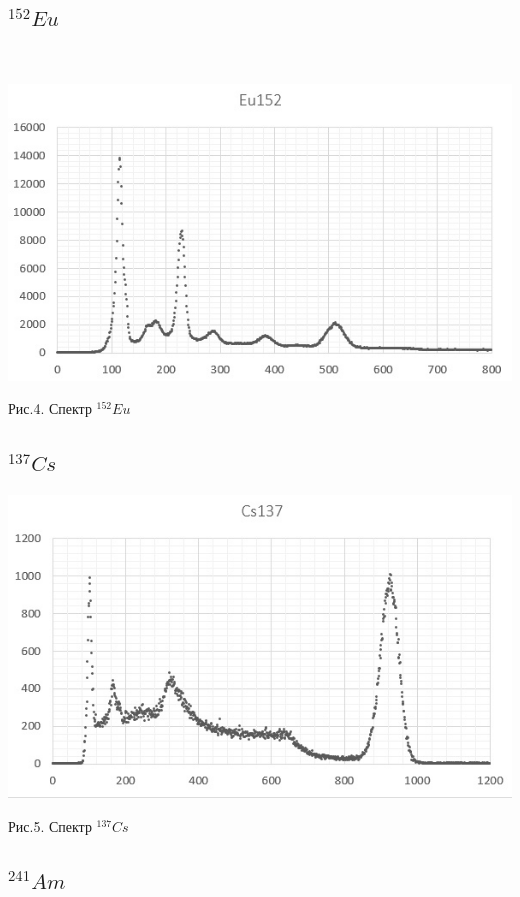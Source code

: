 \documentclass[14pt,a4paper]{scrartcl}
\begin{document}
\subsection{$^{152} Eu$}\\


\begin{center}
\includegraphics[scale=0.7]{Eu.jpg}\newline
\caption{Рис.4. Спектр $^{152} Eu$}
\end{center}


\subsection{$^{137} Cs$}


\begin{center}
\includegraphics[scale=0.7]{Cs.jpg}\newline
\caption{Рис.5. Спектр $^{137} Cs$}
\end{center}


\subsection{$^{241} Am$}
\end{document}

